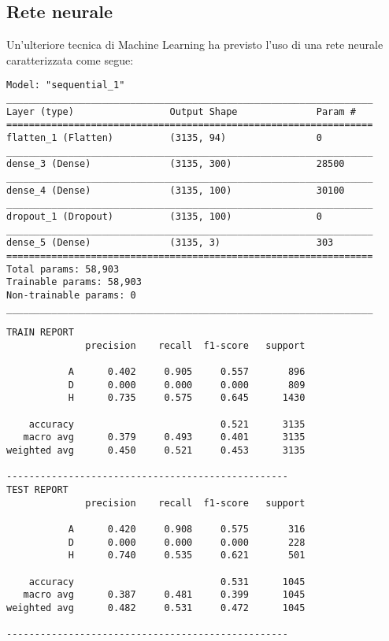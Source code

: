 \subsection{Rete neurale}
Un'ulteriore tecnica di Machine Learning ha previsto l'uso di una rete neurale caratterizzata come segue:
\begin{lstlisting}[style=arch]
Model: "sequential_1"
_________________________________________________________________
Layer (type)                 Output Shape              Param #   
=================================================================
flatten_1 (Flatten)          (3135, 94)                0         
_________________________________________________________________
dense_3 (Dense)              (3135, 300)               28500     
_________________________________________________________________
dense_4 (Dense)              (3135, 100)               30100     
_________________________________________________________________
dropout_1 (Dropout)          (3135, 100)               0         
_________________________________________________________________
dense_5 (Dense)              (3135, 3)                 303       
=================================================================
Total params: 58,903
Trainable params: 58,903
Non-trainable params: 0
_________________________________________________________________
\end{lstlisting}
\begin{lstlisting}[style=report]
TRAIN REPORT
              precision    recall  f1-score   support

           A      0.402     0.905     0.557       896
           D      0.000     0.000     0.000       809
           H      0.735     0.575     0.645      1430

    accuracy                          0.521      3135
   macro avg      0.379     0.493     0.401      3135
weighted avg      0.450     0.521     0.453      3135

--------------------------------------------------
TEST REPORT
              precision    recall  f1-score   support

           A      0.420     0.908     0.575       316
           D      0.000     0.000     0.000       228
           H      0.740     0.535     0.621       501

    accuracy                          0.531      1045
   macro avg      0.387     0.481     0.399      1045
weighted avg      0.482     0.531     0.472      1045

--------------------------------------------------
\end{lstlisting}

